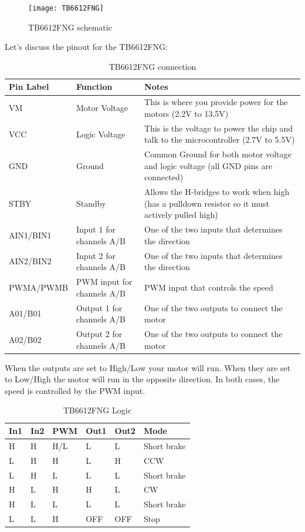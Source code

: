 \documentclass[
12pt, %
a4paper, %
oneside, %
headinclude,footinclude, %
BCOR5mm, %
table,
]{scrartcl}
\begin{document}
\begin{figure}[H]
\centering
\texttt{[image: TB6612FNG]} 
\caption[TB6612FNG schematic]{TB6612FNG schematic}
\label{fig:TB6612FNG}
\end{figure}
Let’s discuss the pinout for the TB6612FNG:


\newcolumntype{b}{X}

\begin{table}[H]
\centering
\begin{adjustwidth}{-1cm}{}
\resizebox{16cm}{!} {%
\begin{tabularx}{18cm}{smb}
\hline
Pin Label & Function & Notes \\
\hline
VM & Motor Voltage  & This is where you provide power for the motors (2.2V to 13.5V)\\
VCC & Logic Voltage & This is the voltage to power the chip and talk to the microcontroller (2.7V to 5.5V)\\
GND & Ground  & Common Ground for both motor voltage and logic voltage (all GND pins are connected)\\
STBY & Standby & Allows the H-bridges to work when high (has a pulldown resistor so it must actively pulled high)\\
AIN1/BIN1 & Input 1 for channels A/B   & One of the two inputs that determines the direction\\
AIN2/BIN2 & Input 2 for channels A/B   & One of the two inputs that determines the direction\\
PWMA/PWMB & PWM input for channels A/B & PWM input that controls the speed\\
A01/B01 & Output 1 for channels A/B  & One of the two outputs to connect the motor\\
A02/B02 & Output 2 for channels A/B  & One of the two outputs to connect the motor\\
\hline
\end{tabularx} } 
\end{adjustwidth}
\label{tab:label}
\caption{TB6612FNG connection}
\end{table}

When the outputs are set to High/Low your motor will run. When they are set to Low/High the motor will run in the opposite direction. In both cases, the speed is controlled by the PWM input.

\begin{table}[H]
\centering
\begin{tabular}{llllll}
\hline
In1  & In2 & PWM & Out1 & Out2 & Mode \\
\hline
H    & H   & H/L & L    &L     & Short brake\\
L    & H   & H   & L    & H    & CCW\\
L    & H   & L   & L    & L    & Short brake\\
H    & L   & H   & H    & L    & CW\\
H    & L   & L   & L    & L    & Short brake\\
L    & L   & H   & OFF  & OFF  & Stop\\
\hline
\end{tabular}
\caption{TB6612FNG Logic}
\label{tab:label}
\end{table}
\end{document}
